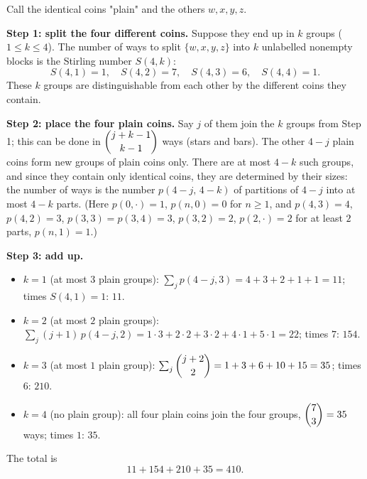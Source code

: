 Call the identical coins "plain" and the others $w,x,y,z$.

\textbf{Step 1: split the four different coins.} Suppose they end up in $k$ groups ($1\le k\le4$). The number of ways to split $\{w,x,y,z\}$ into $k$ unlabelled nonempty blocks is the Stirling number $S(4,k)$:
\[
S(4,1)=1,\quad S(4,2)=7,\quad S(4,3)=6,\quad S(4,4)=1 .
\]
These $k$ groups are distinguishable from each other by the different coins they contain.

\textbf{Step 2: place the four plain coins.} Say $j$ of them join the $k$ groups from Step 1; this can be done in $\dbinom{j+k-1}{k-1}$ ways (stars and bars). The other $4-j$ plain coins form new groups of plain coins only. There are at most $4-k$ such groups, and since they contain only identical coins, they are determined by their sizes: the number of ways is the number $p(4-j,\,4-k)$ of partitions of $4-j$ into at most $4-k$ parts. (Here $p(0,\cdot)=1$, $p(n,0)=0$ for $n\ge1$, and $p(4,3)=4$, $p(4,2)=3$, $p(3,3)=p(3,4)=3$, $p(3,2)=2$, $p(2,\cdot)=2$ for at least $2$ parts, $p(n,1)=1$.)

\textbf{Step 3: add up.}
\begin{itemize}
\item $k=1$ (at most $3$ plain groups): $\sum_j p(4-j,3)=4+3+2+1+1=11$; times $S(4,1)=1$: $11$.
\item $k=2$ (at most $2$ plain groups): $\sum_j (j+1)\,p(4-j,2)=1\cdot3+2\cdot2+3\cdot2+4\cdot1+5\cdot1=22$; times $7$: $154$.
\item $k=3$ (at most $1$ plain group): $\sum_j\dbinom{j+2}{2}=1+3+6+10+15=35$; times $6$: $210$.
\item $k=4$ (no plain group): all four plain coins join the four groups, $\dbinom{7}{3}=35$ ways; times $1$: $35$.
\end{itemize}
The total is
\[
11+154+210+35=\boxed{410}.
\]
